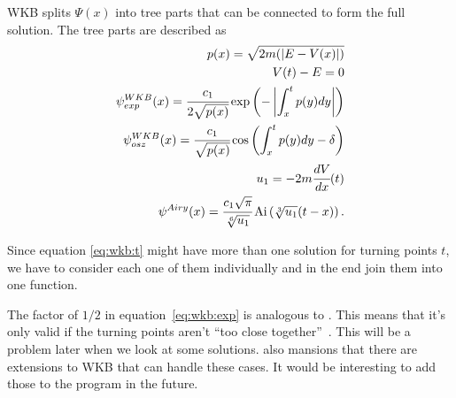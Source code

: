 \documentclass[11pt,DIV=10,final]{scrreprt} %
\begin{document}
WKB splits $\Psi(x)$ into tree parts that can be connected to form the full solution. The tree parts are described as
\begin{align}
\label{eq:wkb:momentum}
  p(x) = \sqrt{2m(|E - V(x)|)} \\
\label{eq:wkb:t}
  V(t) - E = 0 \\
\label{eq:wkb:exp}
  \psi^{WKB}_{exp}(x)= \cfrac{c_{1}}{2 \sqrt{p(x)}} \exp\left(-\left|\int_{x}^{t}p(y) dy\right|\right) \\
\label{eq:wkb:osz}
  \psi^{WKB}_{osz} (x)= \cfrac{c_{1}}{\sqrt{p(x)}} \cos\left(\int_{x}^{t}p(y) dy - \delta \right) \\
  u_{1} = -2 m \cfrac{dV}{dx}(t) \\
\label{eq:airy}
  \psi^{Airy}(x) = \cfrac{c_{1} \sqrt{\pi}}{\sqrt[6]{u_{1}}} \operatorname{Ai}\left(\sqrt[3]{u_{1}} (t - x)\right).
\end{align}

Since equation \ref{eq:wkb:t} might have more than one solution for turning points $t$, we have to consider each one of them individually and in the end join them into one function.

The factor of $1/2$ in equation~\ref{eq:wkb:exp} is analogous to \citep[eq. 92]{robert2020wkb}. This means that it's only valid if the turning points aren't ``too close together''~\citep{robert2020wkb}.
This will be a problem later when we look at some solutions. \cite{robert2020wkb} also mansions that there are extensions to WKB that can handle these cases. It would be interesting to add those to the
program in the future.
\end{document}
